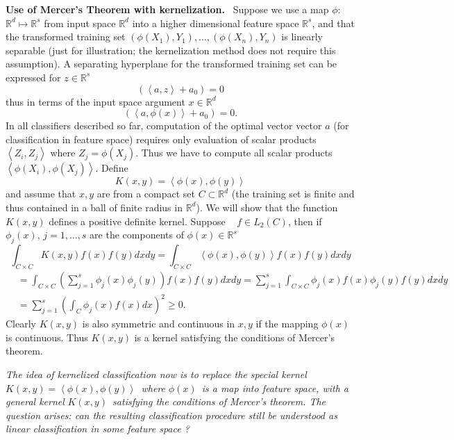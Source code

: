 \documentclass[11pt,twoside]{article}%
\theoremstyle{change}
\begin{document}
\textbf{Use of Mercer's Theorem with kernelization.} \ Suppose we use a map
$\phi$: $\mathbb{R}^{d}\longmapsto\mathbb{R}^{s}$ from input space
$\mathbb{R}^{d}$ into a higher dimensional feature space $\mathbb{R}^{s}$, and
that the transformed training set $\left(  \phi(X_{1}),Y_{1}\right)
,\ldots,\left(  \phi(X_{n}),Y_{n}\right)  $ is linearly separable (just for
illustration; the kernelization method does not require this assumption). A
separating hyperplane for the transformed training set can be expressed for
$z\in\mathbb{R}^{s}$
\[
\left(  \left\langle a,z\right\rangle +a_{0}\right)  =0
\]
thus in terms of the input space argument $x\in\mathbb{R}^{d}$%
\[
\left(  \left\langle a,\phi(x)\right\rangle +a_{0}\right)  =0.
\]
In all classifiers described so far, computation of the optimal vector vector
$a$ (for classification in feature space) requires only evaluation of scalar
products $\left\langle Z_{i},Z_{j}\right\rangle $ where $Z_{j}=\phi(X_{j})$.
Thus we have to compute all scalar products $\left\langle \phi(X_{i}%
),\phi(X_{j})\right\rangle .$ Define
\[
K(x,y)=\left\langle \phi(x),\phi(y)\right\rangle
\]
and assume that $x,y$ are from a compact set $C\subset\mathbb{R}^{d}$ (the
training set is finite and thus contained in a ball of finite radius in
$\mathbb{R}^{d}$). We will show that the function $K(x,y)$ defines a positive
definite kernel. Suppose \textit{\ } $f\in L_{2}(C)$, then if $\phi_{j}(x)$,
$j=1,\ldots,s$ are the components of $\phi(x)\in\mathbb{R}^{s}$
\[
\int_{C\times C}K(x,y)f(x)f(y)dxdy=\int_{C\times C}\left\langle \phi
(x),\phi(y)\right\rangle f(x)f(y)dxdy
\]%
\begin{align*}
& =\int_{C\times C}\left(  \sum_{j=1}^{s}\phi_{j}(x)\phi_{j}(y)\right)
f(x)f(y)dxdy=\sum_{j=1}^{s}\int_{C\times C}\phi_{j}(x)f(x)\phi_{j}%
(y)f(y)dxdy\\
& =\sum_{j=1}^{s}\left(  \int_{C}\phi_{j}(x)f(x)dx\right)  ^{2}\geq0.
\end{align*}
Clearly $K(x,y)$ is also symmetric and continuous in $x,y$ if the mapping
$\phi(x)$ is continuous. Thus $K(x,y)$ is a kernel satisfying the conditions
of Mercer's theorem.

\textit{The idea of kernelized classification now is to replace the special
kernel }$K(x,y)=\left\langle \phi(x),\phi(y)\right\rangle $\textit{\ where
}$\phi(x)$\textit{\ is a map into feature space, with a general kernel
}$K(x,y)$\textit{\ satisfying the conditions of Mercer's theorem. The question
arises: can the resulting classification procedure still be understood as
linear classification in some feature space ? }
\end{document}
